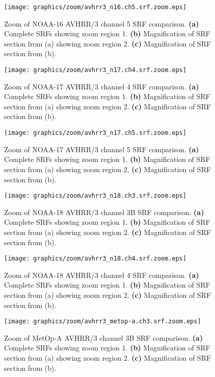 \begin{figure}[htp]
  \centering
  \texttt{[image: graphics/zoom/avhrr3\_n16.ch5.srf.zoom.eps]}
  \caption{Zoom of NOAA-16 AVHRR/3 channel 5 SRF comparison. \textbf{(a)} Complete SRFs showing zoom region 1. \textbf{(b)} Magnification of SRF section from (a) showing zoom region 2.  \textbf{(c)} Magnification of SRF section from (b).}
  \label{fig:avhrr3_n16.ch5.srf.zoom}
\end{figure}

\begin{figure}[htp]
  \centering
  \texttt{[image: graphics/zoom/avhrr3\_n17.ch4.srf.zoom.eps]}
  \caption{Zoom of NOAA-17 AVHRR/3 channel 4 SRF comparison. \textbf{(a)} Complete SRFs showing zoom region 1. \textbf{(b)} Magnification of SRF section from (a) showing zoom region 2.  \textbf{(c)} Magnification of SRF section from (b).}
  \label{fig:avhrr3_n17.ch4.srf.zoom}
\end{figure}

\begin{figure}[htp]
  \centering
  \texttt{[image: graphics/zoom/avhrr3\_n17.ch5.srf.zoom.eps]}
  \caption{Zoom of NOAA-17 AVHRR/3 channel 5 SRF comparison. \textbf{(a)} Complete SRFs showing zoom region 1. \textbf{(b)} Magnification of SRF section from (a) showing zoom region 2.  \textbf{(c)} Magnification of SRF section from (b).}
  \label{fig:avhrr3_n17.ch5.srf.zoom}
\end{figure}

\begin{figure}[htp]
  \centering
  \texttt{[image: graphics/zoom/avhrr3\_n18.ch3.srf.zoom.eps]}
  \caption{Zoom of NOAA-18 AVHRR/3 channel 3B SRF comparison. \textbf{(a)} Complete SRFs showing zoom region 1. \textbf{(b)} Magnification of SRF section from (a) showing zoom region 2.  \textbf{(c)} Magnification of SRF section from (b).}
  \label{fig:avhrr3_n18.ch3.srf.zoom}
\end{figure}

\begin{figure}[htp]
  \centering
  \texttt{[image: graphics/zoom/avhrr3\_n18.ch4.srf.zoom.eps]}
  \caption{Zoom of NOAA-18 AVHRR/3 channel 4 SRF comparison. \textbf{(a)} Complete SRFs showing zoom region 1. \textbf{(b)} Magnification of SRF section from (a) showing zoom region 2.  \textbf{(c)} Magnification of SRF section from (b).}
  \label{fig:avhrr3_n18.ch4.srf.zoom}
\end{figure}


\begin{figure}[htp]
  \centering
  \texttt{[image: graphics/zoom/avhrr3\_metop-a.ch3.srf.zoom.eps]}
  \caption{Zoom of MetOp-A AVHRR/3 channel 3B SRF comparison. \textbf{(a)} Complete SRFs showing zoom region 1. \textbf{(b)} Magnification of SRF section from (a) showing zoom region 2.  \textbf{(c)} Magnification of SRF section from (b).}
  \label{fig:avhrr3_metop-a.ch3.srf.zoom}
\end{figure}

